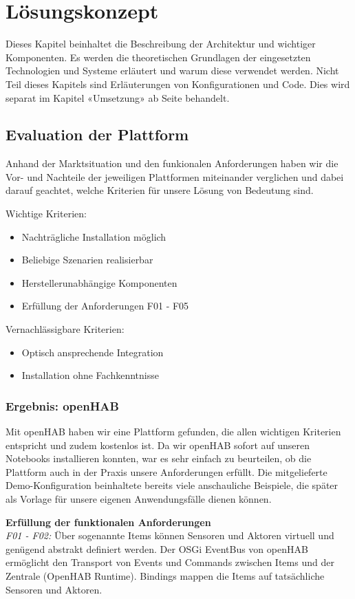 \section{Lösungskonzept}
Dieses Kapitel beinhaltet die Beschreibung der Architektur und wichtiger Komponenten. Es werden die theoretischen Grundlagen der eingesetzten Technologien und Systeme erläutert und warum diese verwendet werden. Nicht Teil dieses Kapitels sind Erläuterungen von Konfigurationen und Code. Dies wird separat im Kapitel «Umsetzung» ab Seite \pageref{sec:chapterRealization} behandelt.

\subsection{Evaluation der Plattform}
Anhand der Marktsituation und den funkionalen Anforderungen haben wir die Vor- und Nachteile der jeweiligen Plattformen miteinander verglichen und dabei darauf geachtet, welche Kriterien für unsere Lösung von Bedeutung sind.

Wichtige Kriterien:
\begin{itemize}
	\item Nachträgliche Installation möglich
	\item Beliebige Szenarien realisierbar
	\item Herstellerunabhängige Komponenten
	\item Erfüllung der Anforderungen F01 - F05
\end{itemize}

Vernachlässigbare Kriterien:
\begin{itemize}
	\item Optisch ansprechende Integration
	\item Installation ohne Fachkenntnisse
\end{itemize}

\subsubsection{Ergebnis: openHAB} 
Mit openHAB haben wir eine Plattform gefunden, die allen wichtigen Kriterien entspricht und zudem kostenlos ist. Da wir openHAB sofort auf unseren Notebooks installieren konnten, war es sehr einfach zu beurteilen, ob die Plattform auch in der Praxis unsere Anforderungen erfüllt. Die mitgelieferte Demo-Konfiguration beinhaltete bereits viele anschauliche Beispiele, die später als Vorlage für unsere eigenen Anwendungsfälle dienen können. 

\textbf{Erfüllung der funktionalen Anforderungen} \\
\textit{F01 - F02:} Über sogenannte Items können Sensoren und Aktoren virtuell und genügend abstrakt definiert werden. Der OSGi EventBus von openHAB ermöglicht den Transport von Events und Commands zwischen Items und der Zentrale (OpenHAB Runtime). Bindings mappen die Items auf tatsächliche Sensoren und Aktoren.

